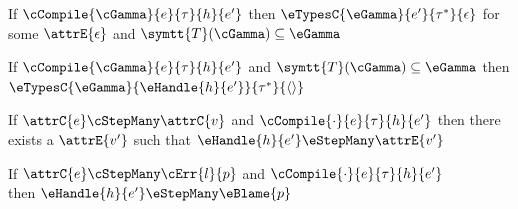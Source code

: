 \begin{theorem}
  If $\cCompile{\cGamma}{e}{\tau}{h}{e'}$
  then $\eTypesC{\eGamma}{e'}{\tau^*}{\epsilon}$
  for some $\attrE{\epsilon}$ and $\symtt{T}(\cGamma) \subseteq \eGamma$
\end{theorem}

\begin{theorem}
  If $\cCompile{\cGamma}{e}{\tau}{h}{e'}$ and $\symtt{T}(\cGamma) \subseteq \eGamma$
  then $\eTypesC{\eGamma}{\eHandle{h}{e'}}{\tau^*}{\langle\rangle}$
\end{theorem}

\begin{theorem}
  If $\attrC{e} \cStepMany \attrC{v}$ and $\cCompile{\cdot}{e}{\tau}{h}{e'}$ then there
  exists a $\attrE{v'}$ such that $\eHandle{h}{e'}\eStepMany \attrE{v'}$
\end{theorem}

\begin{theorem}
  If $\attrC{e} \cStepMany \cErr{l}{p}$ and $\cCompile{\cdot}{e}{\tau}{h}{e'}$\\
  then $\eHandle{h}{e'}\eStepMany \eBlame{p}$
\end{theorem}



